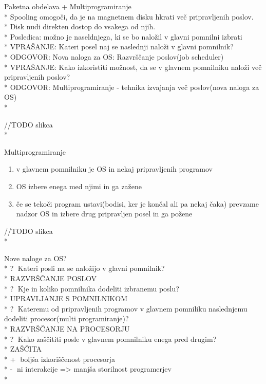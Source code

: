 \documentclass{article}
\begin{document}
Paketna obdelava + Multiprogramiranje\\*
Spooling omogoči, da je na magnetnem disku hkrati več pripravljenih poslov.\\*
Disk nudi direkten dostop do vsakega od njih.\\*
Posledica: možno je naseldnjega, ki se bo naložil v glavni pomnilni izbrati\\*
VPRAŠANJE: Kateri posel naj se naslednji naloži v glavni pomnilnik?\\*
ODGOVOR: Nova naloga za OS: Razvrščanje poslov(job scheduler)\\*
VPRAŠANJE: Kako izkoristiti možnost, da se v glavnem pomnilniku naloži več pripravljenih poslov?\\*
ODGOVOR: Multiprogramiranje - tehnika izvajanja več poslov(nova naloga za OS)\\*

//TODO slikca\\*

Multiprogramiranje
\begin{enumerate}
  \item v glavnem pomnilniku je OS in nekaj pripravljenih programov
  \item OS izbere enega med njimi in ga zažene
  \item če se tekoči program ustavi(bodisi, ker je končal ali pa nekaj čaka) prevzame nadzor OS in izbere drug pripravljen posel in ga požene
\end{enumerate}

//TODO slikca\\*

Nove naloge za OS?\\*
\textcircled{?} Kateri posli na se naložijo v glavni pomnilnik?\\*
RAZVRŠČANJE POSLOV\\*
\textcircled{?} Kje in koliko pomnilnika dodeliti izbranemu poslu?\\*
UPRAVLJANJE S POMNILNIKOM\\*
\textcircled{?} Kateremu od pripravljenih programov v glavnem pomniliku naslednjemu dodeliti procesor(multi programiranje)?\\*
RAZVRŠČANJE NA PROCESORJU\\*
\textcircled{?} Kako zaščititi posle v glavnem pomnilniku enega pred drugim?\\*
ZAŠČITA\\*
\textcircled{+} boljša izkoriščenost procesorja\\*
\textcircled{-} ni interakcije => manjša storilnost programerjev\\*
\end{document}
